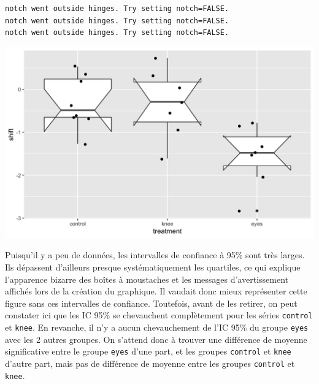 \documentclass[a4paperpaper,]{article}
\newenvironment{Shaded}{\begin{snugshade}}{\end{snugshade}}
\newcommand{\DataTypeTok}[1]{\textcolor[rgb]{0.00,0.34,0.68}{#1}}
\newcommand{\FloatTok}[1]{\textcolor[rgb]{0.69,0.50,0.00}{#1}}
\newcommand{\KeywordTok}[1]{\textcolor[rgb]{0.12,0.11,0.11}{\textbf{#1}}}
\newcommand{\NormalTok}[1]{\textcolor[rgb]{0.12,0.11,0.11}{#1}}
\newcommand{\OperatorTok}[1]{\textcolor[rgb]{0.12,0.11,0.11}{#1}}
\newcommand{\StringTok}[1]{\textcolor[rgb]{0.75,0.01,0.01}{#1}}
\begin{document}
\begin{verbatim}
notch went outside hinges. Try setting notch=FALSE.
notch went outside hinges. Try setting notch=FALSE.
notch went outside hinges. Try setting notch=FALSE.
\end{verbatim}

\begin{center}\includegraphics[width=0.9\linewidth]{figure/unnamed-chunk-75-1} \end{center}

Puisqu'il y a peu de données, les intervalles de confiance à 95\% sont très larges. Ils dépassent d'ailleurs presque systématiquement les quartiles, ce qui explique l'apparence bizarre des boîtes à moustaches et les messages d'avertissement affichés lors de la création du graphique. Il vaudait donc mieux représenter cette figure sans ces intervalles de confiance. Toutefois, avant de les retirer, on peut constater ici que les IC 95\% se chevauchent complètement pour les séries \texttt{control} et \texttt{knee}. En revanche, il n'y a aucun chevauchement de l'IC 95\% du groupe \texttt{eyes} avec les 2 autres groupes. On s'attend donc à trouver une différence de moyenne significative entre le groupe \texttt{eyes} d'une part, et les groupes \texttt{control} et \texttt{knee} d'autre part, mais pas de différence de moyenne entre les groupes \texttt{control} et \texttt{knee}.

\begin{Shaded}
\end{Shaded}
\end{document}
